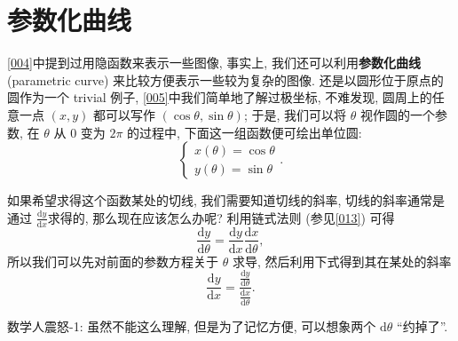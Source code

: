\section{参数化曲线}\label{021}

\ref{004}中提到过用隐函数来表示一些图像, 事实上,
我们还可以利用\textbf{参数化曲线} (parametric curve)
来比较方便表示一些较为复杂的图像. 还是以圆形位于原点的圆作为一个 trivial
例子, \ref{005}中我们简单地了解过极坐标, 不难发现, 圆周上的任意一点
\((x,y)\) 都可以写作 \((\cos\theta, \sin\theta)\); 于是, 我们可以将
\(\theta\) 视作圆的一个参数, 在 \(\theta\) 从 \(0\) 变为 \(2\pi\)
的过程中, 下面这一组函数便可绘出单位圆: \[
\begin{cases}
x(\theta)=\cos\theta\\
y(\theta)=\sin\theta
\end{cases}.
\]

如果希望求得这个函数某处的切线, 我们需要知道切线的斜率,
切线的斜率通常是通过 \(\frac{\mathrm{d}y}{\mathrm{d}x}\)求得的,
那么现在应该怎么办呢? 利用链式法则 (参见\ref{013}) 可得 \[
\frac{\mathrm{d}y}{\mathrm{d}\theta}=\frac{\mathrm{d}y}{\mathrm{d}x}\frac{\mathrm{d}x}{\mathrm{d}\theta},
\] 所以我们可以先对前面的参数方程关于 \(\theta\) 求导,
然后利用下式得到其在某处的斜率 \[
\frac{\mathrm{d}y}{\mathrm{d}x}=\frac{\frac{\mathrm{d}y}{\mathrm{d}\theta}}{\frac{\mathrm{d}x}{\mathrm{d}\theta}}.
\]

\begin{newquote}
数学人震怒-1: 虽然不能这么理解, 但是为了记忆方便, 可以想象两个
\(\mathrm{d}\theta\) ``约掉了''.
\end{newquote}

